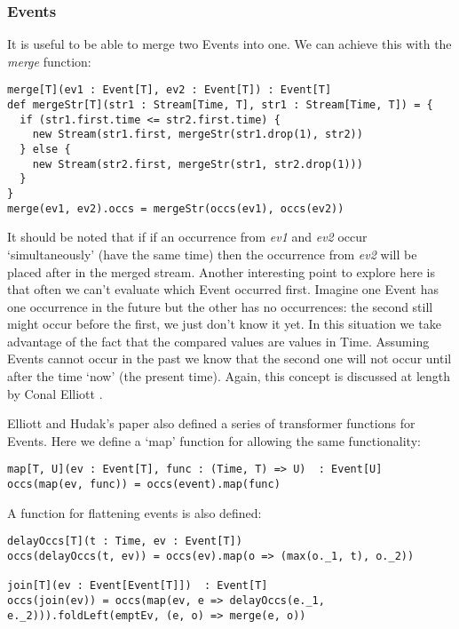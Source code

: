       \subsubsection{Events}
        It is useful to be able to merge two Events into one. We can achieve this with the \emph{merge} function:

\begin{verbatim}
merge[T](ev1 : Event[T], ev2 : Event[T]) : Event[T]
def mergeStr[T](str1 : Stream[Time, T], str1 : Stream[Time, T]) = {
  if (str1.first.time <= str2.first.time) {
    new Stream(str1.first, mergeStr(str1.drop(1), str2))
  } else {
    new Stream(str2.first, mergeStr(str1, str2.drop(1)))
  }
}
merge(ev1, ev2).occs = mergeStr(occs(ev1), occs(ev2))
\end{verbatim}            

      It should be noted that if if an occurrence from \emph{ev1} and \emph{ev2} occur `simultaneously' (have the same time) then
      the occurrence from \emph{ev2} will be placed after in the merged stream. Another interesting point to explore
      here is that often we can't evaluate which Event occurred first. Imagine one Event has one occurrence in
      the future but the other has no occurrences: the second still might occur before the first, we just don't know it
      yet. In this situation we take advantage of the fact that the compared values are values in Time. Assuming
      Events cannot occur in the past we know that the second one will not occur until after the time `now' (the
      present time). Again, this concept is discussed at length by Conal Elliott \cite{Elliott2009}.
       
      Elliott and Hudak's paper also defined a series of transformer functions for Events. Here we define a
     `map' function for allowing the same functionality:

\begin{verbatim}
map[T, U](ev : Event[T], func : (Time, T) => U)  : Event[U]
occs(map(ev, func)) = occs(event).map(func)
\end{verbatim}     

      A function for flattening events is also defined:

\begin{verbatim}
delayOccs[T](t : Time, ev : Event[T])
occs(delayOccs(t, ev)) = occs(ev).map(o => (max(o._1, t), o._2))

join[T](ev : Event[Event[T]])  : Event[T]
occs(join(ev)) = occs(map(ev, e => delayOccs(e._1, e._2))).foldLeft(emptEv, (e, o) => merge(e, o))
\end{verbatim}        


